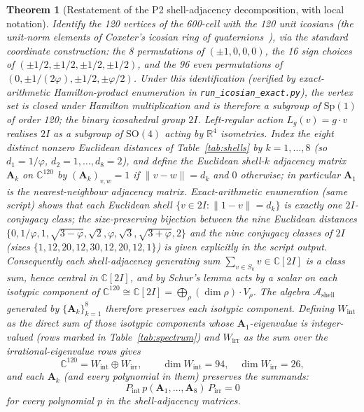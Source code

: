 \documentclass[12pt]{article}
\newtheorem{theorem}{Theorem}
\begin{document}
\begin{theorem}[Restatement of the P2 shell-adjacency decomposition, with local notation]\label{thm:decoupling}
Identify the 120 vertices of the 600-cell with the 120 unit icosians (the unit-norm elements of Coxeter's icosian ring of quaternions~\citep{Coxeter1973, MoodyPatera1993, CascadeAlgSubstrate}), via the standard coordinate construction: the 8 permutations of $(\pm 1, 0, 0, 0)$, the 16 sign choices of $(\pm 1/2, \pm 1/2, \pm 1/2, \pm 1/2)$, and the 96 even permutations of $(0, \pm 1/(2\varphi), \pm 1/2, \pm \varphi/2)$. Under this identification (verified by exact-arithmetic Hamilton-product enumeration in \texttt{run\_icosian\_exact.py}), the vertex set is closed under Hamilton multiplication and is therefore a subgroup of $\mathrm{Sp}(1)$ of order 120; the binary icosahedral group $2I$. Left-regular action $L_g(v) = g \cdot v$ realises $2I$ as a subgroup of $\mathrm{SO}(4)$ acting by $\mathbb{R}^4$ isometries. Index the eight distinct nonzero Euclidean distances of Table~\ref{tab:shells} by $k = 1, \ldots, 8$ (so $d_1 = 1/\varphi$, $d_2 = 1, \ldots, d_8 = 2$), and define the \emph{Euclidean shell-$k$ adjacency matrix} $\mathbf{A}_k$ on $\mathbb{C}^{120}$ by $(\mathbf{A}_k)_{v, w} = 1$ if $\|v - w\| = d_k$ and $0$ otherwise; in particular $\mathbf{A}_1$ is the nearest-neighbour adjacency matrix. Exact-arithmetic enumeration (same script) shows that each Euclidean shell $\{v \in 2I : \|1 - v\| = d_k\}$ is \emph{exactly one} $2I$-conjugacy class; the size-preserving bijection between the nine Euclidean distances $\{0, 1/\varphi, 1, \sqrt{3-\varphi}, \sqrt{2}, \varphi, \sqrt{3}, \sqrt{3+\varphi}, 2\}$ and the nine conjugacy classes of $2I$ (sizes $\{1, 12, 20, 12, 30, 12, 20, 12, 1\}$) is given explicitly in the script output. Consequently each shell-adjacency generating sum $\sum_{v \in S_k} v \in \mathbb{C}[2I]$ is a class sum, hence central in $\mathbb{C}[2I]$, and by Schur's lemma acts by a scalar on each isotypic component of $\mathbb{C}^{120} \cong \mathbb{C}[2I] = \bigoplus_\rho (\dim \rho) \cdot V_\rho$. The algebra $\mathcal{A}_{\mathrm{shell}}$ generated by $\{\mathbf{A}_k\}_{k=1}^{8}$ therefore preserves each isotypic component. Defining $W_{\mathrm{int}}$ as the direct sum of those isotypic components whose $\mathbf{A}_1$-eigenvalue is integer-valued (rows marked in Table~\ref{tab:spectrum}) and $W_{\mathrm{irr}}$ as the sum over the irrational-eigenvalue rows gives
\begin{equation}
    \mathbb{C}^{120} = W_{\mathrm{int}} \oplus W_{\mathrm{irr}}, \qquad \dim W_{\mathrm{int}} = 94, \quad \dim W_{\mathrm{irr}} = 26,
\end{equation}
and each $\mathbf{A}_k$ (and every polynomial in them) preserves the summands:
\begin{equation}
    P_{\mathrm{int}}\, p(\mathbf{A}_1, \ldots, \mathbf{A}_8)\, P_{\mathrm{irr}} = 0
\end{equation}
for every polynomial $p$ in the shell-adjacency matrices.
\end{theorem}
\end{document}
